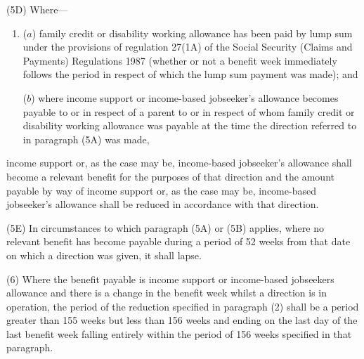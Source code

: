 \documentclass[a4paper]{article}
\begin{document}
(5D) Where—
\begin{enumerate}\item[]
($a$) family credit or disability working allowance has been paid by lump sum under the provisions of regulation 27(1A) of the Social Security (Claims and Payments) Regulations 1987 (whether or not a benefit week immediately follows the period in respect of which the lump sum payment was made); and

($b$) where income support 
or income-based jobseeker’s allowance  %
becomes payable to or in respect of a parent to or in respect of whom family credit or disability working allowance was payable at the time the direction referred to in paragraph (5A) was made, 
\end{enumerate}
income support 
or, as the case may be, income-based jobseeker’s allowance  %
shall become a relevant benefit for the purposes of that direction and the amount payable by way of income support 
or, as the case may be, income-based jobseeker’s allowance  %
shall be reduced in accordance with that direction.

(5E) In circumstances to which paragraph (5A) or (5B) applies, where no relevant benefit has become payable during a period of 52 weeks from that date on which a direction was given, it shall lapse.

%

(6) Where the benefit payable is income support or income-based jobseekers allowance and there is a change in the benefit week whilst a direction is in operation, the period of the reduction specified in paragraph (2) shall be a period greater than 155 weeks but less than 156 weeks and ending on the last day of the last benefit week falling entirely within the period of 156 weeks specified in that paragraph.
\end{document}
